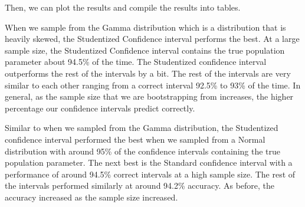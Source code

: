 \documentclass[12pt]{article}
\begin{document}
Then, we can plot the results and compile the results into tables.

When we sample from the Gamma distribution which is a distribution that
is heavily skewed, the Studentized Confidence interval performs the
best. At a large sample size, the Studentized Confidence interval
contains the true population parameter about 94.5\% of the time. The
Studentized confidence interval outperforms the rest of the intervals by
a bit. The rest of the intervals are very similar to each other ranging
from a correct interval 92.5\% to 93\% of the time. In general, as the
sample size that we are bootstrapping from increases, the higher
percentage our confidence intervals predict correctly.

Similar to when we sampled from the Gamma distribution, the Studentized
confidence interval performed the best when we sampled from a Normal
distribution with around 95\% of the confidence intervals containing the
true population parameter. The next best is the Standard confidence
interval with a performance of around 94.5\% correct intervals at a high
sample size. The rest of the intervals performed similarly at around
94.2\% accuracy. As before, the accuracy increased as the sample size
increased.
\end{document}
